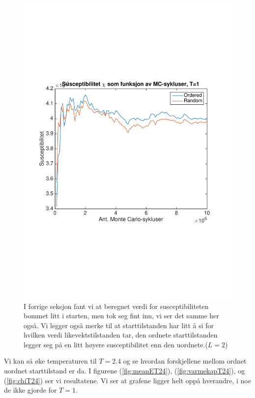\documentclass[norsk, 10pt]{article}
\begin{document}
\begin{figure}[H]
\centering
\includegraphics[scale = 0.5, trim = 1cm 8cm 1cm 8cm]{b_chi_MC_L2_T1.pdf}
\caption{I forrige seksjon fant vi at beregnet verdi for susceptibiliteten bommet litt i starten, men tok seg fint inn, vi ser det samme her også. Vi legger også merke til at starttilstanden har litt å si for hvilken verdi likevektstilstanden tar, den ordnete starttilstanden legger seg på en litt høyere susceptibilitet enn den uordnete.($L=2$)}
\label{fig:chiT1}
\end{figure}

Vi kan så øke temperaturen til $T=2.4$ og se hvordan forskjellene mellom ordnet uordnet starttilstand er da. I figurene (\ref{fig:meanET24}), (\ref{fig:varmekapT24}), og (\ref{fig:chiT24}) ser vi resultatene. Vi ser at grafene ligger helt oppå hverandre, i noe de ikke gjorde for $T=1$.
\end{document}
